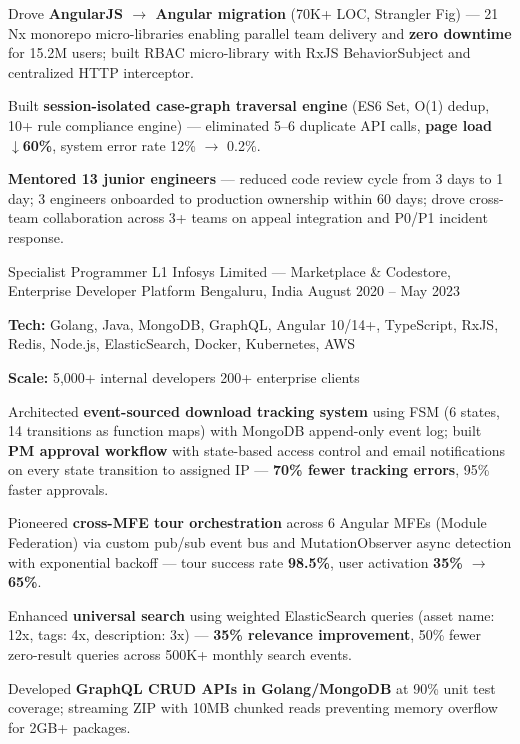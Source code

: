 \begin{cventries}
{\begin{cvitems}
      \item {Drove \textbf{AngularJS $\rightarrow$ Angular migration} (70K+ LOC, Strangler Fig) --- 21 Nx monorepo micro-libraries enabling parallel team delivery and \textbf{zero downtime} for 15.2M users; built RBAC micro-library with RxJS BehaviorSubject and centralized HTTP interceptor.}
      \item {Built \textbf{session-isolated case-graph traversal engine} (ES6 Set, O(1) dedup, 10+ rule compliance engine) --- eliminated 5--6 duplicate API calls, \textbf{page load $\downarrow$60\%}, system error rate 12\% $\rightarrow$ 0.2\%.}
      \item {\textbf{Mentored 13 junior engineers} --- reduced code review cycle from 3 days to 1 day; 3 engineers onboarded to production ownership within 60 days; drove cross-team collaboration across 3+ teams on appeal integration and P0/P1 incident response.}
    \end{cvitems}
  }

\cventry
  {Specialist Programmer L1}
  {Infosys Limited --- Marketplace \& Codestore, Enterprise Developer Platform}
  {Bengaluru, India}
  {August 2020 -- May 2023}
  {
    \begin{cvitems}
      \item {\textbf{Tech:} Golang, Java, MongoDB, GraphQL, Angular 10/14+, TypeScript, RxJS, Redis, Node.js, ElasticSearch, Docker, Kubernetes, AWS}
      \item {\textbf{Scale:} 5,000+ internal developers \textbar{} 200+ enterprise clients}
      \item {Architected \textbf{event-sourced download tracking system} using FSM (6 states, 14 transitions as function maps) with MongoDB append-only event log; built \textbf{PM approval workflow} with state-based access control and email notifications on every state transition to assigned IP --- \textbf{70\% fewer tracking errors}, 95\% faster approvals.}
      \item {Pioneered \textbf{cross-MFE tour orchestration} across 6 Angular MFEs (Module Federation) via custom pub/sub event bus and MutationObserver async detection with exponential backoff --- tour success rate \textbf{98.5\%}, user activation \textbf{35\% $\rightarrow$ 65\%}.}
      \item {Enhanced \textbf{universal search} using weighted ElasticSearch queries (asset name: 12x, tags: 4x, description: 3x) --- \textbf{35\% relevance improvement}, 50\% fewer zero-result queries across 500K+ monthly search events.}
      \item {Developed \textbf{GraphQL CRUD APIs in Golang/MongoDB} at 90\% unit test coverage; streaming ZIP with 10MB chunked reads preventing memory overflow for 2GB+ packages.}
    \end{cvitems}
  }

\end{cventries}
